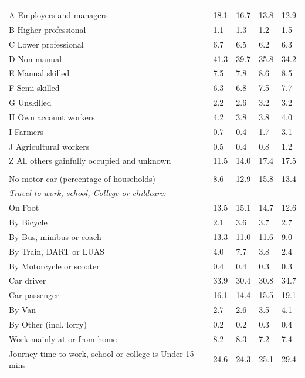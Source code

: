 \documentclass{article}
\begin{document}
\begin{table}[h]
\begin{tabular}{KTTTT}
\hline
    \\ 
    \hline
A Employers and managers & 18.1& 16.7& 13.8& 12.9\\
B Higher professional & 1.1& 1.3& 1.2& 1.5\\
C Lower professional & 6.7& 6.5& 6.2& 6.3\\
D Non-manual & 41.3& 39.7& 35.8& 34.2\\
E Manual skilled & 7.5& 7.8& 8.6& 8.5\\
F Semi-skilled & 6.3& 6.8& 7.5& 7.7\\
G Unskilled & 2.2& 2.6& 3.2& 3.2\\
H Own account workers & 4.2& 3.8& 3.8& 4.0\\
I Farmers & 0.7& 0.4& 1.7& 3.1\\
J Agricultural workers & 0.5& 0.4& 0.8& 1.2\\
Z All others gainfully occupied and unknown & 11.5& 14.0& 17.4& 17.5\\
\hline
{}\hline
    \\ 
    \hline
No motor car (percentage of households) &  8.6& 12.9& 15.8& 
13.4\\
    \hline 
\emph{Travel to work, school, College or childcare:} & & & \\
\quad On Foot & 13.5& 15.1& 14.7& 12.6\\ 
\quad By Bicycle & 2.1& 3.6& 3.7& 2.7\\ 
\quad By Bus, minibus or coach & 13.3& 11.0& 11.6&  9.0\\
\quad By Train, DART or LUAS & 4.0& 7.7& 3.8& 2.4\\
\quad By Motorcycle or scooter & 0.4& 0.4& 0.3& 0.3\\
\quad Car driver & 33.9 & 30.4& 30.8& 34.7\\
\quad Car passenger & 16.1& 14.4& 15.5& 19.1\\
\quad By Van & 2.7& 2.6& 3.5& 4.1\\
\quad By Other (incl. lorry) & 0.2& 0.2& 0.3& 0.4\\
    \hline
Work mainly at or from home & 8.2& 8.3& 7.2& 7.4\\
Journey time to work, school or college is Under 15 mins & 24.6& 24.3& 25.1& 29.4\\

\end{tabular}
\end{table}
\end{document}
